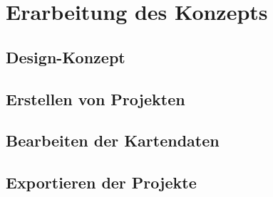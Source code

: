 \chapter{Erarbeitung des Konzepts}

\section{Design-Konzept}
\section{Erstellen von Projekten}
\section{Bearbeiten der Kartendaten}
\section{Exportieren der Projekte}
